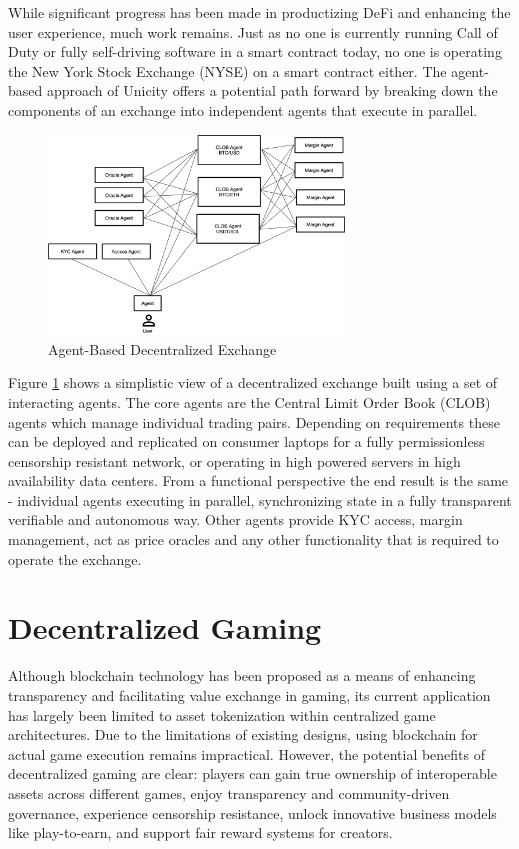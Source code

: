 \documentclass{article}
\begin{document}
\vspace{2mm}

While significant progress has been made in productizing DeFi and enhancing the user experience, much work remains. Just as no one is currently running Call of Duty or fully self-driving software in a smart contract today, no one is operating the New York Stock Exchange (NYSE) on a smart contract either. The agent-based approach of Unicity offers a potential path forward by breaking down the components of an exchange into independent agents that execute in parallel. 

\begin{figure}[H]
    \centering
    \includegraphics[width=0.7\textwidth]{ABEX.png}
    \caption{Agent-Based Decentralized Exchange}
    \label{fig:ABEX}
\end{figure}

 
Figure \ref{fig:ABEX} shows a simplistic view of a decentralized exchange built using a set of interacting agents. The core agents are the Central Limit Order Book (CLOB) agents which manage individual trading pairs. Depending on requirements these can be deployed and replicated on consumer laptops for a fully permissionless censorship resistant network, or operating in high powered servers in high availability data centers. From a functional perspective the end result is the same - individual agents executing in parallel, synchronizing state in a fully transparent verifiable and autonomous way. Other agents provide KYC access, margin management, act as price oracles and any other functionality that is required to operate the exchange. 


\section{Decentralized Gaming}

Although blockchain technology has been proposed as a means of enhancing transparency and facilitating value exchange in gaming, its current application has largely been limited to asset tokenization within centralized game architectures. Due to the limitations of existing designs, using blockchain for actual game execution remains impractical. However, the potential benefits of decentralized gaming are clear: players can gain true ownership of interoperable assets across different games, enjoy transparency and community-driven governance, experience censorship resistance, unlock innovative business models like play-to-earn, and support fair reward systems for creators.
\end{document}
